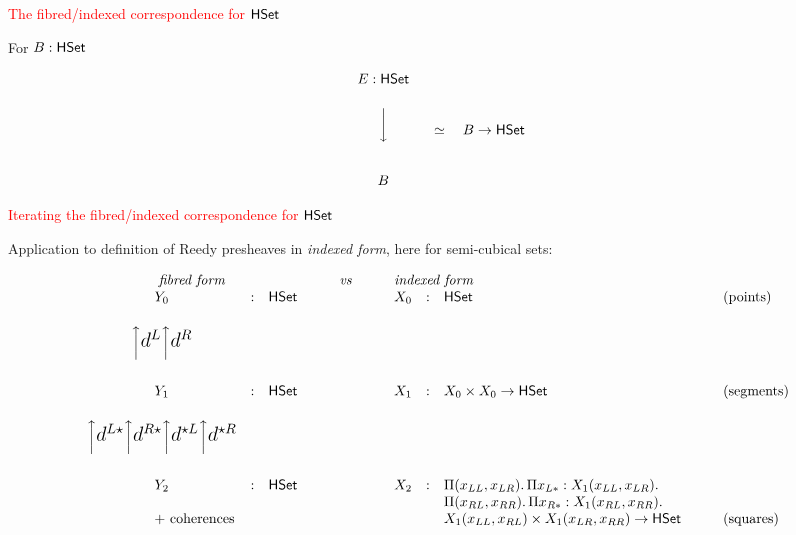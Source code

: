 \documentclass[12pt,landscape]{article}
\begin{document}
\begin{LARGE}
\begin{sf}
\begin{center}
\textcolor{red}{\huge The fibred/indexed correspondence for $\HSet{}$}
\end{center}

\bigskip
\bigskip
\bigskip
\bigskip
\bigskip
For $B:\HSet{l}$

$$\begin{array}{c}E:\HSet{l}\\[5mm]\bigg\downarrow\\[1cm] B
\end{array}
~~~\simeq~~~ B \rightarrow \HSet{l}$$

\newpage

\begin{center}
\textcolor{red}{\huge Iterating the fibred/indexed correspondence for $\HSet{}$}
\end{center}

\bigskip
\bigskip

\noindent Application to definition of Reedy presheaves in \emph{indexed form}, here for semi-cubical sets:

$$
\begin{array}{cllccllll}
\multicolumn{3}{c}{\mbox{\emph{fibred form}}} & \qquad\mathit{vs}\qquad & \multicolumn{3}{l}{\mbox{\emph{indexed form}}} \\
Y_0 &:& \HSet{l} & & X_0 & : & \HSet{l} & \mbox{(points)}\\[5mm]
\bigg\uparrow {\mbox{\Large $d^L$}}\bigg\uparrow{\mbox{\Large $d^R$}}\\[8mm]
Y_1 &:& \HSet{l} & & X_1 & : & X_0 \times X_0 \rightarrow \HSet{l} & \mbox{(segments)}\\[5mm]
\bigg\uparrow{\mbox{\Large $d^{L\star}$}}\bigg\uparrow{\mbox{\Large $d^{R\star}$}}\bigg\uparrow{\mbox{\Large $d^{\star L}$}}\bigg\uparrow{\mbox{\Large $d^{\star R}$}} \\[8mm]
Y_2 &:& \HSet{l} & & X_2 & : & \Pi (x_{LL},x_{LR}).\, \Pi x_{L*}:X_1 (x_{LL},x_{LR}).\\
& & & & & & \Pi (x_{RL},x_{RR}).\, \Pi x_{R*}:X_1 (x_{RL},x_{RR}).\, \\
\multicolumn{3}{c}{\mbox{~+ coherences}} & & & & X_1 (x_{LL},x_{RL}) \times X_1 (x_{LR},x_{RR}) \rightarrow \HSet{l} \qquad & \mbox{(squares)}\\
\end{array}
$$


\end{sf}
\end{LARGE}
\end{document}
